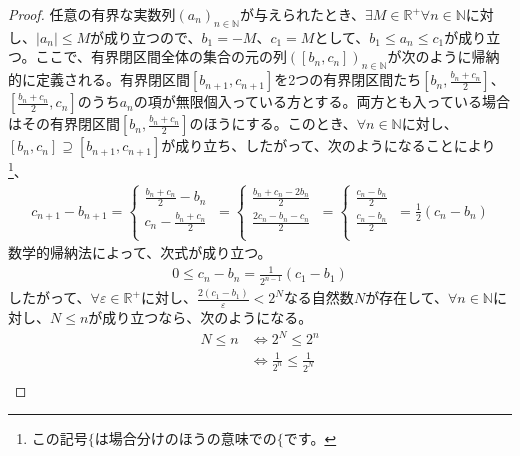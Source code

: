 \documentclass[dvipdfmx]{jsarticle}
\begin{document}
\begin{proof}
任意の有界な実数列$\left( a_{n} \right)_{n \in \mathbb{N}}$が与えられたとき、$\exists M \in \mathbb{R}^{+}\forall n \in \mathbb{N}$に対し、$\left| a_{n} \right| \leq M$が成り立つので、$b_{1} = - M$、$c_{1} = M$として、$b_{1} \leq a_{n} \leq c_{1}$が成り立つ。ここで、有界閉区間全体の集合の元の列$\left( \left[ b_{n},c_{n} \right] \right)_{n \in \mathbb{N}}$が次のように帰納的に定義される。有界閉区間$\left[ b_{n + 1},c_{n + 1} \right]$を2つの有界閉区間たち$\left[ b_{n},\frac{b_{n} + c_{n}}{2} \right]$、$\left[ \frac{b_{n} + c_{n}}{2},c_{n} \right]$のうち$a_{n}$の項が無限個入っている方とする。両方とも入っている場合はその有界閉区間$\left[ b_{n},\frac{b_{n} + c_{n}}{2} \right]$のほうにする。このとき、$\forall n \in \mathbb{N}$に対し、$\left[ b_{n},c_{n} \right] \supseteq \left[ b_{n + 1},c_{n + 1} \right]$が成り立ち、したがって、次のようになることにより\footnote{この記号$\{$は場合分けのほうの意味での$\{$です。}、
\begin{align*}
c_{n + 1} - b_{n + 1} = \left\{ \begin{matrix}
\frac{b_{n} + c_{n}}{2} - b_{n} \\
c_{n} - \frac{b_{n} + c_{n}}{2} \\
\end{matrix} \right.\  = \left\{ \begin{matrix}
\frac{b_{n} + c_{n} - 2b_{n}}{2} \\
\frac{2c_{n} - b_{n} - c_{n}}{2} \\
\end{matrix} \right.\  = \left\{ \begin{matrix}
\frac{c_{n} - b_{n}}{2} \\
\frac{c_{n} - b_{n}}{2} \\
\end{matrix} \right.\  = \frac{1}{2}\left( c_{n} - b_{n} \right)
\end{align*}
数学的帰納法によって、次式が成り立つ。
\begin{align*}
0 \leq c_{n} - b_{n} = \frac{1}{2^{n - 1}}\left( c_{1} - b_{1} \right)
\end{align*}
したがって、$\forall\varepsilon \in \mathbb{R}^{+}$に対し、$\frac{2\left( c_{1} - b_{1} \right)}{\varepsilon} < 2^{N}$なる自然数$N$が存在して、$\forall n \in \mathbb{N}$に対し、$N \leq n$が成り立つなら、次のようになる。
\begin{align*}
N \leq n &\Leftrightarrow 2^{N} \leq 2^{n}\\
&\Leftrightarrow \frac{1}{2^{n}} \leq \frac{1}{2^{N}}\\

\end{align*}
\end{proof}
\end{document}
